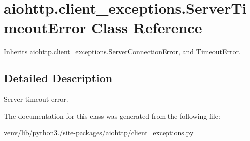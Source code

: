 \hypertarget{classaiohttp_1_1client__exceptions_1_1_server_timeout_error}{}\section{aiohttp.\+client\+\_\+exceptions.\+Server\+Timeout\+Error Class Reference}
\label{classaiohttp_1_1client__exceptions_1_1_server_timeout_error}


Inherits \hyperlink{classaiohttp_1_1client__exceptions_1_1_server_connection_error}{aiohttp.\+client\+\_\+exceptions.\+Server\+Connection\+Error}, and Timeout\+Error.



\subsection{Detailed Description}
\begin{DoxyVerb}Server timeout error.\end{DoxyVerb}
 

The documentation for this class was generated from the following file\+:\begin{DoxyCompactItemize}
\item 
venv/lib/python3./site-\/packages/aiohttp/client\+\_\+exceptions.\+py\end{DoxyCompactItemize}
